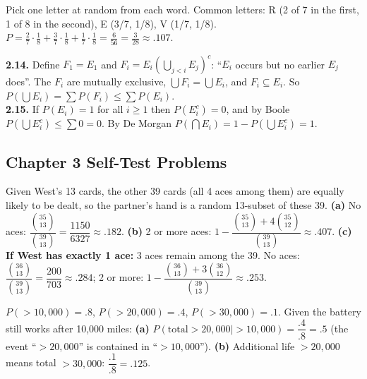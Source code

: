 \documentclass[11pt]{article}
\let\oldsubsection\subsection
\renewcommand{\subsection}{\Needspace{14\baselineskip}\oldsubsection}
\begin{document}
\begin{exbox}
Pick one letter at random from each word. Common letters: R (2 of 7 in the first, 1 of 8 in the second), E (3/7, 1/8), V (1/7, 1/8). $P=\tfrac27\cdot\tfrac18+\tfrac37\cdot\tfrac18+\tfrac17\cdot\tfrac18=\tfrac6{56}=\boxed{\tfrac3{28}}\approx.107$.
\end{exbox}

\begin{exbox}
\textbf{2.14.} Define $F_1=E_1$ and $F_i=E_i\left(\bigcup_{j<i}E_j\right)^c$: ``$E_i$ occurs but no earlier $E_j$ does''. The $F_i$ are mutually exclusive, $\bigcup F_i=\bigcup E_i$, and $F_i\subseteq E_i$. So $P(\bigcup E_i)=\sum P(F_i)\le\sum P(E_i)$.\\
\textbf{2.15.} If $P(E_i)=1$ for all $i\ge1$ then $P(E_i^c)=0$, and by Boole $P\left(\bigcup E_i^c\right)\le\sum0=0$. By De Morgan $P\left(\bigcap E_i\right)=1-P\left(\bigcup E_i^c\right)=1$.
\end{exbox}

\subsection{Chapter 3 Self-Test Problems}

\begin{exbox}
Given West's 13 cards, the other 39 cards (all 4 aces among them) are equally likely to be dealt, so the partner's hand is a random 13-subset of these 39. \textbf{(a)} No aces: $\dfrac{\binom{35}{13}}{\binom{39}{13}}=\dfrac{1150}{6327}\approx\boxed{.182}$. \textbf{(b)} 2 or more aces: $1-\dfrac{\binom{35}{13}+4\binom{35}{12}}{\binom{39}{13}}\approx\boxed{.407}$. \textbf{(c) If West has exactly 1 ace:} 3 aces remain among the 39. No aces: $\dfrac{\binom{36}{13}}{\binom{39}{13}}=\dfrac{200}{703}\approx\boxed{.284}$; 2 or more: $1-\dfrac{\binom{36}{13}+3\binom{36}{12}}{\binom{39}{13}}\approx\boxed{.253}$.
\end{exbox}

\begin{exbox}
$P(>10{,}000)=.8$, $P(>20{,}000)=.4$, $P(>30{,}000)=.1$. Given the battery still works after 10{,}000 miles: \textbf{(a)} $P(\text{total}>20{,}000\mid>10{,}000)=\dfrac{.4}{.8}=\boxed{.5}$ (the event ``$>20{,}000$'' is contained in ``$>10{,}000$''). \textbf{(b)} Additional life $>20{,}000$ means total $>30{,}000$: $\dfrac{.1}{.8}=\boxed{.125}$.
\end{exbox}
\end{document}
